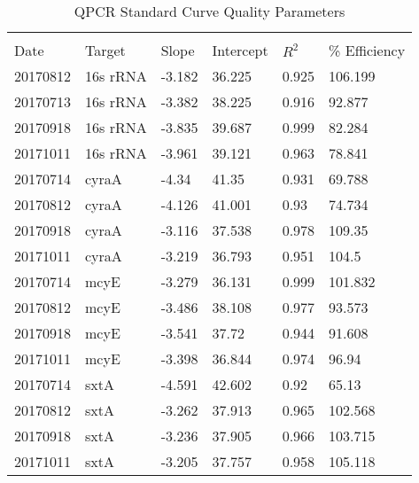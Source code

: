 
\setcounter{table}{0}
\renewcommand{\thetable}{\Alph{chapter}\arabic{table}}
 \label{ch:extra}

\begin{table}[]
	\caption{QPCR Standard Curve Quality Parameters}
	\label{tab:qpcr}
	\begin{center}
\begin{tabular}{llllll} 
	\hline \\
	
Date     & Target   & Slope  & Intercept & $R^2$ & \% Efficiency \\ \hline
20170812 & 16s rRNA & -3.182 & 36.225    & 0.925 & 106.199        \\
20170713 & 16s rRNA & -3.382 & 38.225    & 0.916 & 92.877         \\
20170918 & 16s rRNA & -3.835 & 39.687    & 0.999 & 82.284         \\
20171011 & 16s rRNA & -3.961 & 39.121    & 0.963 & 78.841         \\
20170714 & cyraA    & -4.34  & 41.35     & 0.931 & 69.788         \\
20170812 & cyraA    & -4.126 & 41.001    & 0.93  & 74.734         \\
20170918 & cyraA    & -3.116 & 37.538    & 0.978 & 109.35         \\
20171011 & cyraA    & -3.219 & 36.793    & 0.951 & 104.5          \\
20170714 & mcyE     & -3.279 & 36.131    & 0.999 & 101.832        \\
20170812 & mcyE     & -3.486 & 38.108    & 0.977 & 93.573         \\
20170918 & mcyE     & -3.541 & 37.72     & 0.944 & 91.608         \\
20171011 & mcyE     & -3.398 & 36.844    & 0.974 & 96.94          \\
20170714 & sxtA     & -4.591 & 42.602    & 0.92  & 65.13          \\
20170812 & sxtA     & -3.262 & 37.913    & 0.965 & 102.568        \\
20170918 & sxtA     & -3.236 & 37.905    & 0.966 & 103.715        \\
20171011 & sxtA     & -3.205 & 37.757    & 0.958 & 105.118   \\ \hline
\end{tabular}
\end{center}
\end{table}

